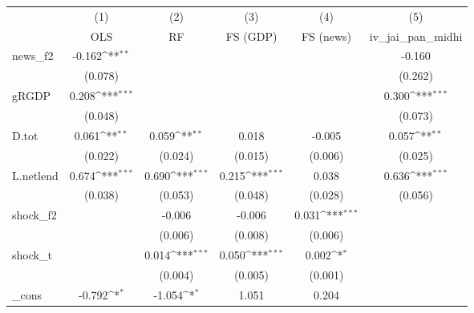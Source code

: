 {
\def\sym#1{\ifmmode^{#1}\else\(^{#1}\)\fi}
\begin{tabular}{l*{5}{c}}
\toprule
            &\multicolumn{1}{c}{(1)}&\multicolumn{1}{c}{(2)}&\multicolumn{1}{c}{(3)}&\multicolumn{1}{c}{(4)}&\multicolumn{1}{c}{(5)}\\
            &\multicolumn{1}{c}{OLS}&\multicolumn{1}{c}{RF}&\multicolumn{1}{c}{FS (GDP)}&\multicolumn{1}{c}{FS (news)}&\multicolumn{1}{c}{iv\_jai\_pan\_midhi}\\
\midrule
news\_f2     &      -0.162\sym{**} &                     &                     &                     &      -0.160         \\
            &     (0.078)         &                     &                     &                     &     (0.262)         \\
\addlinespace
gRGDP       &       0.208\sym{***}&                     &                     &                     &       0.300\sym{***}\\
            &     (0.048)         &                     &                     &                     &     (0.073)         \\
\addlinespace
D.tot       &       0.061\sym{**} &       0.059\sym{**} &       0.018         &      -0.005         &       0.057\sym{**} \\
            &     (0.022)         &     (0.024)         &     (0.015)         &     (0.006)         &     (0.025)         \\
\addlinespace
L.netlend   &       0.674\sym{***}&       0.690\sym{***}&       0.215\sym{***}&       0.038         &       0.636\sym{***}\\
            &     (0.038)         &     (0.053)         &     (0.048)         &     (0.028)         &     (0.056)         \\
\addlinespace
shock\_f2    &                     &      -0.006         &      -0.006         &       0.031\sym{***}&                     \\
            &                     &     (0.006)         &     (0.008)         &     (0.006)         &                     \\
\addlinespace
shock\_t     &                     &       0.014\sym{***}&       0.050\sym{***}&       0.002\sym{*}  &                     \\
            &                     &     (0.004)         &     (0.005)         &     (0.001)         &                     \\
\addlinespace
\_cons      &      -0.792\sym{*}  &      -1.054\sym{*}  &       1.051         &       0.204         &                     \\

\end{tabular}}
